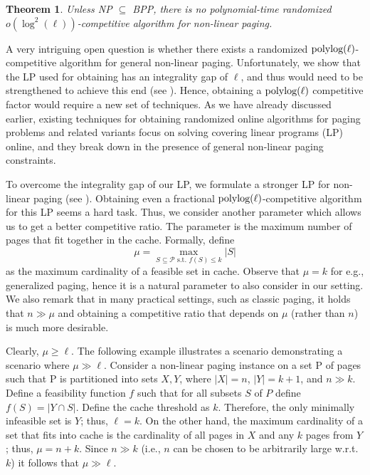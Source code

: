 \documentclass[11pt]{article}
\newcommand{\cP}{{\mathcal{P}}}
\newtheorem{theorem}[thm]{Theorem}
\begin{document}
\begin{theorem}
	\label{thm:LB}
Unless \textnormal{NP $\subseteq $ BPP}, there is no polynomial-time randomized $o(\log^2 (\ell))$-competitive algorithm for \textnormal{non-linear paging}.
\end{theorem}

A very intriguing open question is whether there exists a randomized $\textnormal{polylog} (\ell)$-competitive algorithm for general non-linear paging. Unfortunately, we show that the LP used for obtaining  has an integrality gap of $\ell$, and thus would need to be strengthened to achieve this end (see ).  Hence, obtaining a $\textnormal{polylog} (\ell)$ competitive factor would require a new set of techniques. As we have already discussed earlier, existing techniques for obtaining randomized online algorithms for paging problems and related variants focus on solving covering linear programs (LP) online, and they break down in the presence of general non-linear paging constraints. 

To overcome the integrality gap of our LP, we formulate a stronger LP for non-linear paging (see ). Obtaining even a fractional $\textnormal{polylog}(\ell)$-competitive algorithm for this LP seems a hard task. Thus, we consider another parameter which allows us to get a better competitive ratio. The parameter is the maximum number of pages that fit together in the cache. Formally, define 
\begin{equation}
	\label{eq:mu}
	\mu = \max_{S \subseteq \cP \text{ s.t. } f(S) \leq k} |S|
\end{equation} as the maximum cardinality of a feasible set in cache. Observe that $\mu = k$ for e.g., generalized paging, hence it is a natural parameter to also consider in our setting. We also remark that in many practical settings, such as classic paging, it holds that $n \gg \mu$ and obtaining a competitive ratio that depends on $\mu$ (rather than $n$) is much more desirable. 

Clearly, $\mu \geq \ell$. The following example illustrates a scenario demonstrating a scenario where $\mu \gg \ell$. Consider a non-linear paging
instance on a set P of pages such that P is partitioned into sets $X,Y$, where $|X| = n$, $|Y| = k+1$, and $n \gg k$.
Define a feasibility function $f$ such that for all subsets $S$ of $P$ define $f(S) = |Y \cap S|$. Define the cache
threshold as $k$. Therefore, the only minimally infeasible set is $Y$; thus, $\ell = k$. On the other hand, the
maximum cardinality of a set that fits into cache is the cardinality of all pages in $X$ and any $k$ pages from
$Y$; thus, $\mu = n+k$. Since $n \gg k$ (i.e., $n$ can be chosen to be arbitrarily large w.r.t. $k$) it follows that $\mu \gg \ell$. 
\end{document}

